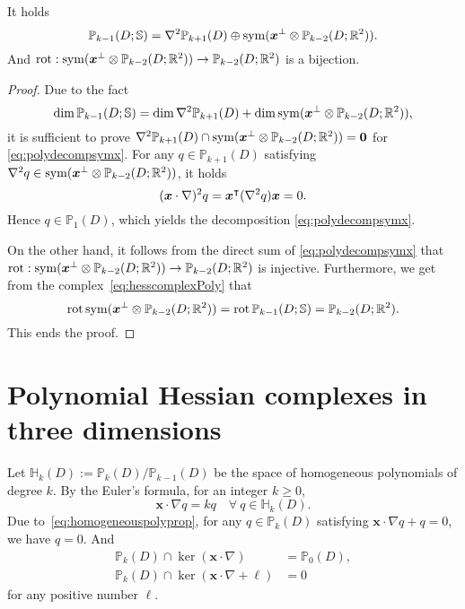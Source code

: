 \begin{lemma}\label{lem:rot}%
It holds
\begin{equation}\label{eq:polydecompsymx}
\mathbb P_{k-1}(D;\mathbb S)=\nabla^2\mathbb P_{k+1}(D)\oplus \operatorname{sym}(\boldsymbol x^{\perp}\otimes\mathbb P_{k-2}(D;\mathbb R^2)).
\end{equation}
And $\operatorname*{rot}: \operatorname{sym}(\boldsymbol x^{\perp}\otimes\mathbb P_{k-2}(D;\mathbb R^2)) \to  \mathbb P_{k-2}(D;\mathbb R^2)$ is a bijection.
\end{lemma}
\begin{proof}
Due to the fact
\[
\dim\mathbb P_{k-1}(D;\mathbb S)=\dim\nabla^2\mathbb P_{k+1}(D) + \dim\operatorname{sym}(\boldsymbol x^{\perp}\otimes\mathbb P_{k-2}(D;\mathbb R^2)),
\] 
it is sufficient to prove $\nabla^2\mathbb P_{k+1}(D)\cap \operatorname{sym}(\boldsymbol x^{\perp}\otimes\mathbb P_{k-2}(D;\mathbb R^2))=\boldsymbol0$ for \eqref{eq:polydecompsymx}. For any $q\in\mathbb P_{k+1}(D)$ satisfying $\nabla^2q\in\operatorname{sym}(\boldsymbol x^{\perp}\otimes\mathbb P_{k-2}(D;\mathbb R^2))$, it holds
\[
(\boldsymbol x\cdot\nabla)^2q=\boldsymbol x^{\intercal}(\nabla^2q)\boldsymbol x=0.
\]
Hence $q\in \mathbb P_{1}(D)$, which yields the decomposition \eqref{eq:polydecompsymx}. 

On the other hand, it follows from the direct sum of \eqref{eq:polydecompsymx} that $\operatorname*{rot}: \operatorname{sym}(\boldsymbol x^{\perp}\otimes\mathbb P_{k-2}(D;\mathbb R^2)) \to  \mathbb P_{k-2}(D;\mathbb R^2)$ is injective.
Furthermore, we get from the complex~\eqref{eq:hesscomplexPoly} that
\[
\operatorname*{rot}\operatorname{sym}(\boldsymbol x^{\perp}\otimes\mathbb P_{k-2}(D;\mathbb R^2)) =\operatorname*{rot}\mathbb P_{k-1}(D;\mathbb S)=\mathbb P_{k-2}(D;\mathbb R^2).
\]
This ends the proof.
\end{proof}

\section{Polynomial Hessian complexes in three dimensions}

Let $\mathbb H_k(D):=\mathbb P_k(D)/\mathbb P_{k-1}(D)$ be the space of homogeneous polynomials of degree $k$. 
By the Euler's formula, for an integer $k\geq 0$,
\begin{equation}\label{eq:homogeneouspolyprop}
\boldsymbol x\cdot\nabla q=kq\quad\forall~q\in\mathbb H_k(D).
\end{equation}
Due to~\eqref{eq:homogeneouspolyprop}, for any $q\in\mathbb P_k(D)$ satisfying $\boldsymbol x\cdot\nabla q+q=0$, we have $q=0$.
And
\begin{align}\label{eq:radialderivativeprop}
\mathbb P_k(D)\cap\ker(\boldsymbol x\cdot\nabla) & =\mathbb P_0(D),\\
\label{eq:radialderivativeprop1}
\mathbb P_k(D)\cap\ker(\boldsymbol x\cdot\nabla +\ell) &=0
\end{align}
for any positive number $\ell$.


